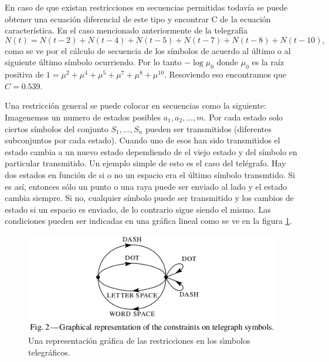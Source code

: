 En caso de que existan restricciones en secuencias permitidas
todav\'ia se puede obtener una ecuaci\'on diferencial de este tipo y
encontrar C de la ecuaci\'on caracter\'istica. En el caso mencionado
anteriormente de la telegraf\'ia
\begin{equation}
N(t) = N(t-2)+N(t-4)+N(t-5)+N(t-7)+N(t-8)+N(t-10),
\end{equation}
como se ve por el c\'alculo de secuencia de los s\'imbolos de acuerdo
al \'ultimo o al siguiente \'ultimo s\'imbolo ocurriendo.  Por lo
tanto $-\log\mu_{0}$ donde $\mu_{0}$ es la ra\'iz positiva de $1
= \mu^{2}+\mu^{4}+\mu^{5}+\mu^{7}+\mu^{8}+\mu^{10}$. Resoviendo eso
encontramos que $C = 0.539$.

Una restricci\'on general se puede colocar en secuencias como la
siguiente: Imagenemos un numero de estados posibles $a_{1},
a_{2},\ldots,{m}$. Por cada estado solo ciertos s\'imbolos del
conjunto $S_{1},\ldots,S_{n}$ pueden ser transmitidos (diferentes
subconjuntos por cada estado). Cuando uno de esos han sido
transmitidos el estado cambia a un nuevo estado dependiendo de el
viejo estado y del s\'imbolo en particular transmitido. Un ejemplo
simple de esto es el caso del tel\'egrafo. Hay dos estados en
funci\'on de si o no un espacio era el \'ultimo s\'imbolo transmtido.
Si es as\'i, entonces s\'olo un punto o una raya puede ser enviado al
lado y el estado cambia siempre. Si no, cualquier s\'imbolo puede ser
transmitido y los cambios de estado si un espacio es enviado, de lo
contrario sigue siendo el mismo.  Las condiciones pueden ser indicadas
en una gr\'afica lineal como se ve en la figura \ref{fig:2}. 

\begin{figure}[!ht]
\centerline{\includegraphics[width=120mm]{Imagenes/Pagina4-Figura2.png}}
\caption{Una representaci\'{o}n gr\'{a}fica de las restricciones 
en los s\'{\i}mbolos telegr\'{a}ficos.}
\label{fig:2}
\end{figure}

